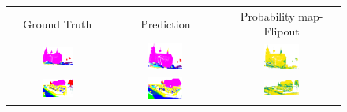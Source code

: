     \begin{figure}[h!]
        \centering
        \begin{tabular}{ccc}
            Ground Truth & Prediction & Probability map-Flipout \\
            \includegraphics[width=0.33\textwidth, height=0.18\textheight]{images/seg_output/sem3d_seg_output/1_GT.png} &
            \includegraphics[width=0.33\textwidth, height=0.18\textheight]{images/seg_output/flipout/sem3d_1.png}& 
            \includegraphics[width=0.33\textwidth, height=0.18\textheight]{images/seg_output/flipout/1_fout_prob.png}\\

            \includegraphics[width=0.33\textwidth, height=0.18\textheight]{images/seg_output/sem3d_seg_output/2_GT.png} &
            \includegraphics[width=0.33\textwidth, height=0.18\textheight]{images/seg_output/flipout/sem3d_2.png}& 
            \includegraphics[width=0.33\textwidth, height=0.18\textheight]{images/seg_output/flipout/2_fout_prob.png}\\


\end{tabular}
\end{figure}
